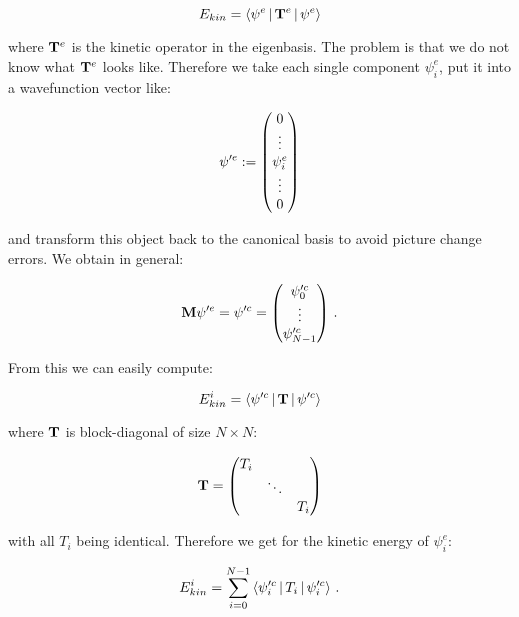 \begin{equation*}
  E_{kin} = \Braket{\psi^{e} | \mathbf{T}^{e} | \psi^{e}}
\end{equation*}

where $\mathbf{T}^{e}$ is the kinetic operator in the eigenbasis. The problem is
that we do not know what $\mathbf{T}^{e}$ looks like. Therefore we take each single
component $\psi^{e}_i$, put it into a wavefunction vector like:

\begin{equation*}
  \psi^{\prime e} :=
  \begin{pmatrix}
    0 \\ \vdots \\ \psi^{e}_i \\ \vdots \\ 0
  \end{pmatrix}
\end{equation*}

and transform this object back to the canonical basis to avoid picture change
errors. We obtain in general:

\begin{equation*}
  \mathbf{M} \psi^{\prime e} = \psi^{\prime c} =
  \begin{pmatrix}
    \psi^{\prime c}_0 \\ \vdots \\ \psi^{\prime c}_{N-1}
  \end{pmatrix} \,.
\end{equation*}

From this we can easily compute:

\begin{equation*}
  E^i_{kin} = \Braket{\psi^{\prime c} | \mathbf{T} | \psi^{\prime c}}
\end{equation*}

where $\mathbf{T}$ is block-diagonal of size $N \times N$:

\begin{equation*}
  \mathbf{T} =
  \begin{pmatrix}
    T_i & {}     & {} \\
    {}  & \ddots & {} \\
    {}  & {}     & T_i
  \end{pmatrix}
\end{equation*}

with all $T_i$ being identical. Therefore we get for the kinetic energy
of $\psi^{e}_i$:

\begin{equation}
    E^i_{kin} = \sum_{i=0}^{N-1} \Braket{\psi^{\prime c}_i | T_i | \psi^{\prime c}_i} \,.
\end{equation}

